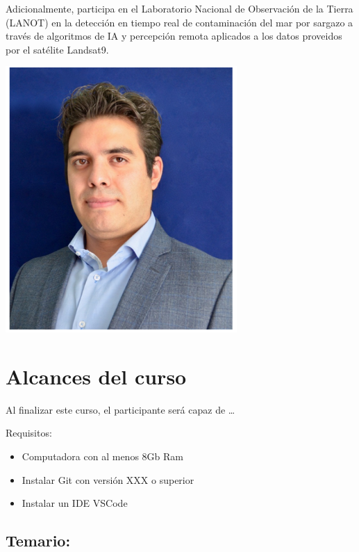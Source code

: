 \documentclass[
]{book}
\providecommand{\tightlist}{%
  \setlength{\itemsep}{0pt}\setlength{\parskip}{0pt}}
\begin{document}
Adicionalmente, participa en el Laboratorio Nacional de Observación de la Tierra (LANOT) en la detección en tiempo real de contaminación del mar por sargazo a través de algoritmos de IA y percepción remota aplicados a los datos proveidos por el satélite Landsat9.

\begin{center}\includegraphics[width=250pt]{img/00-presentacion/arturo} \end{center}

\section*{Alcances del curso}\label{alcances-del-curso}

Al finalizar este curso, el participante será capaz de \ldots{}

Requisitos:

\begin{itemize}
\tightlist
\item
  Computadora con al menos 8Gb Ram
\item
  Instalar Git con versión XXX o superior
\item
  Instalar un IDE VSCode
\end{itemize}

\subsection*{Temario:}\label{temario}
\end{document}
